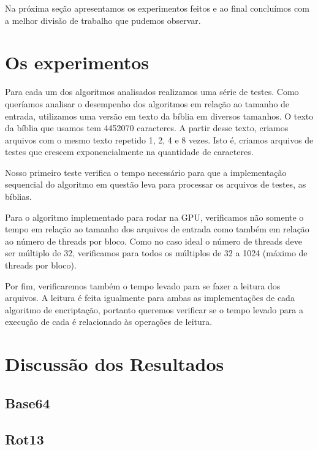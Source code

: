 \documentclass[12pt]{article}
\begin{document}
Na próxima seção apresentamos os experimentos feitos e ao final 
concluímos com a melhor divisão de trabalho que pudemos observar.


\newpage
\section{Os experimentos}
Para cada um dos algoritmos analisados realizamos uma série de testes. 
Como queríamos analisar o desempenho dos algoritmos em relação ao 
tamanho de entrada, utilizamos uma versão em texto da bíblia em
diversos tamanhos. O texto da bíblia que usamos tem 4452070 caracteres.
A partir desse texto, criamos arquivos com o mesmo texto repetido 1, 2,
4 e 8 vezes. Isto é, criamos arquivos de testes que crescem 
exponencialmente na quantidade de caracteres.

Nosso primeiro teste verifica o tempo necessário para que a 
implementação sequencial do algoritmo em questão leva para processar os
arquivos de testes, as bíblias.

Para o algoritmo implementado para rodar na GPU, verificamos não
somente o tempo em relação ao tamanho dos arquivos de entrada como
também em relação ao número de threads por bloco. Como no caso ideal o
número de threads deve ser múltiplo de 32, verificamos para todos os
múltiplos de 32 a 1024 (máximo de threads por bloco).

Por fim, verificaremos também o tempo levado para se fazer a leitura dos
arquivos. A leitura é feita igualmente para ambas as implementações de
cada algoritmo de encriptação, portanto queremos verificar se o tempo
levado para a execução de cada é relacionado às operações de leitura.


\newpage
\section{Discussão dos Resultados}

\subsection{Base64}
\subsection{Rot13}
\end{document}
